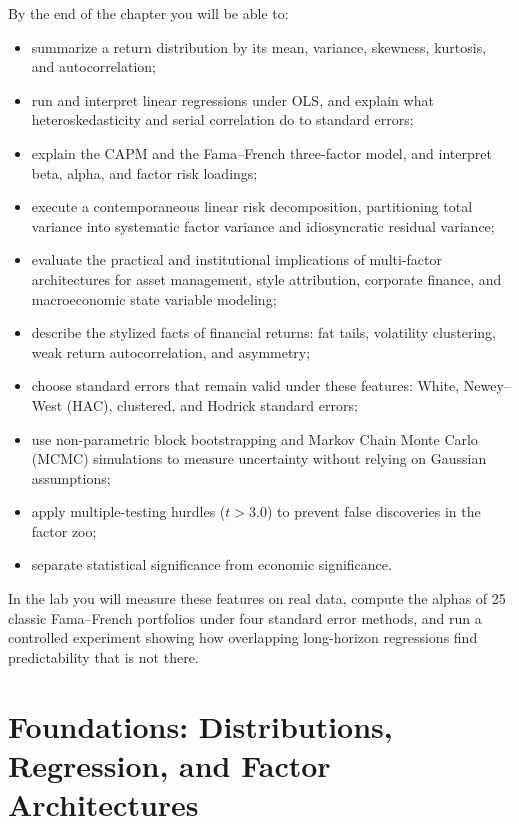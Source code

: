 By the end of the chapter you will be able to:
\begin{itemize}
  \item summarize a return distribution by its mean, variance, skewness, kurtosis, and autocorrelation;
  \item run and interpret linear regressions under OLS, and explain what heteroskedasticity and serial correlation do to standard errors;
  \item explain the CAPM and the Fama--French three-factor model, and interpret beta, alpha, and factor risk loadings;
  \item execute a contemporaneous linear risk decomposition, partitioning total variance into systematic factor variance and idiosyncratic residual variance;
  \item evaluate the practical and institutional implications of multi-factor architectures for asset management, style attribution, corporate finance, and macroeconomic state variable modeling;
  \item describe the stylized facts of financial returns: fat tails, volatility clustering, weak return autocorrelation, and asymmetry;
  \item choose standard errors that remain valid under these features: White, Newey--West (HAC), clustered, and Hodrick standard errors;
  \item use non-parametric block bootstrapping and Markov Chain Monte Carlo (MCMC) simulations to measure uncertainty without relying on Gaussian assumptions;
  \item apply multiple-testing hurdles ($t > 3.0$) to prevent false discoveries in the factor zoo;
  \item separate statistical significance from economic significance.
\end{itemize}

In the lab you will measure these features on real data, compute the alphas of 25 classic Fama--French portfolios under four standard error methods, and run a controlled experiment showing how overlapping long-horizon regressions find predictability that is not there.

\section{Foundations: Distributions, Regression, and Factor Architectures}
\label{sec:03-foundations}

